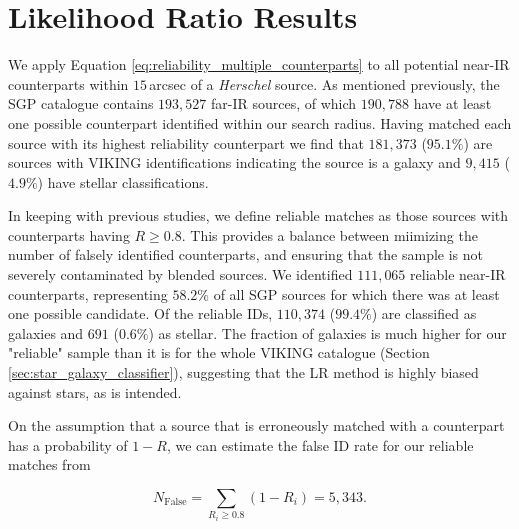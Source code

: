 \section{Likelihood Ratio Results}
\label{sec:lr_results}

We apply Equation \ref{eq:reliability_multiple_counterparts} to all potential near-IR counterparts within $15\,$arcsec of a \textit{Herschel} source. As mentioned previously, the SGP catalogue contains $193,527$ far-IR sources, of which $190,788$ have at least one possible counterpart identified within our search radius. Having matched each source with its highest reliability counterpart we find that $181,373$ ($95.1\%$) are sources with VIKING identifications indicating the source is a galaxy and $9,415$ ($4.9\%$) have stellar classifications. 

In keeping with previous studies, we define reliable matches as those sources with counterparts having $R \geq 0.8$. This provides a balance between miimizing the number of falsely identified counterparts, and ensuring that the sample is not severely contaminated by blended sources. We identified $111,065$ reliable near-IR counterparts, representing $58.2\%$ of all SGP sources for which there was at least one possible candidate. Of the reliable IDs, $110,374$ ($99.4\%$) are classified as galaxies and $691$ ($0.6\%$) as stellar. The fraction of galaxies is much higher for our "reliable" sample than it is for the whole VIKING catalogue (Section \ref{sec:star_galaxy_classifier}), suggesting that the LR method is highly biased against stars, as is intended. 

On the assumption that a source that is erroneously matched with a counterpart has a probability of $1 - R$, we can estimate the false ID rate for our reliable matches from

\begin{equation}
    N_{\textrm{False}} = \sum_{R_i \geq 0.8} (1 - R_i) = 5,343.
\label{eq:false_ids}
\end{equation}

